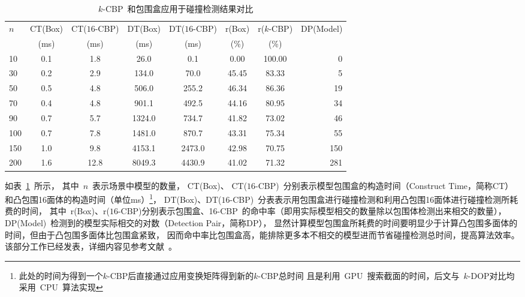 \begin{table}[htb]
\caption{$k$-CBP~和包围盒应用于碰撞检测结果对比}
\label{tab:exp:box:kcbp:collsiondetection}
\centering
\begin{tabular}{lccccccr}
 \toprule[1.5pt]
 \multirow{2}{*}{$n$} & CT(Box) & CT($16$-CBP) & DT(Box) & DT($16$-CBP) & r(Box) & r($k$-CBP) & \multirow{2}{*}{DP(Model)} \\
                      & (ms)    & (ms)          & (ms)  & (ms)          & (\%)      & (\%)  &   \\
  \midrule[1.0pt]
   10 & 0.1 & 1.8 &    26.0  & 0.1    & 0.00  & 100.00 & 0\\
   30 & 0.2 & 2.9 &   134.0  & 70.0   & 45.45 & 83.33 & 5\\
   50 & 0.5 & 4.8 &   506.0  & 255.2  & 46.34 & 86.36 & 19 \\
   70 & 0.4 & 4.8 &   901.1  & 492.5  & 44.16 & 80.95 & 34 \\
   90 & 0.7 & 5.7 &  1324.0  & 734.7  & 41.82 & 73.02 & 46 \\
  100 & 0.7 & 7.8 &  1481.0  & 870.7  & 43.31 & 75.34 & 55 \\
  150 & 1.0 & 9.8 &  4153.1  & 2473.0 & 42.98 & 70.75 & 150 \\
  200 & 1.6 & 12.8 & 8049.3  & 4430.9 & 41.02 & 71.32 & 281 \\
  \bottomrule[1.5pt]
 \end{tabular}
\end{table}

如表~\ref{tab:exp:box:kcbp:collsiondetection}~所示，
其中~$n$~表示场景中模型的数量， CT(Box)、 CT($16$-CBP)~分别表示模型包围盒的构造时间（Construct Time，简称CT）和凸包围16面体的构造时间（单位ms）\footnote{此处的时间为得到一个$k$-CBP后直接通过应用变换矩阵得到新的$k$-CBP总时间
且是利用~GPU~搜索截面的时间，后文与~$k$-DOP对比均采用~CPU~算法实现}， DT(Box)、DT($16$-CBP)~分表表示用包围盒进行碰撞检测和利用凸包围16面体进行碰撞检测所耗费的时间，
其中~r(Box)、r($16$-CBP)分别表示包围盒、16-CBP~的命中率（即用实际模型相交的数量除以包围体检测出来相交的数量）， DP(Model)~检测到的模型实际相交的对数（Detection Pair，简称DP），
显然计算模型包围盒所耗费的时间要明显少于计算凸包围多面体的时间，但由于凸包围多面体比包围盒紧致，
因而命中率比包围盒高，能排除更多本不相交的模型进而节省碰撞检测总时间，提高算法效率。该部分工作已经发表，详细内容见参考文献~。


